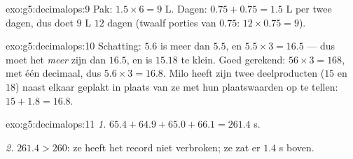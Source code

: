 \begin{solution}{exo:g5:decimalops:9}
Pak: $1.5 \times 6 = 9$ L. Dagen: $0.75 + 0.75 = 1.5$ L per twee dagen, dus
doet $9$ L $12$ dagen (twaalf porties van $0.75$: $12 \times 0.75 = 9$).
\end{solution}

\begin{solution}{exo:g5:decimalops:10}
Schatting: $5.6$ is meer dan $5.5$, en $5.5 \times 3 = 16.5$ --- dus moet het
 \emph{meer} zijn dan $16.5$, en is $15.18$ te klein. Goed gerekend:
$56 \times 3 = 168$, met één decimaal, dus $5.6 \times 3 = 16.8$. Milo heeft
zijn twee deelproducten ($15$ en $18$) naast elkaar geplakt in plaats van ze
met hun plaatswaarden op te tellen: $15 + 1.8 = 16.8$.
\end{solution}

\begin{solution}{exo:g5:decimalops:11}
\emph{1.} $65.4 + 64.9 + 65.0 + 66.1 = 261.4$ s.

\emph{2.} $261.4 > 260$: ze heeft het record niet verbroken; ze zat er
$1.4$ s boven.
\end{solution}
